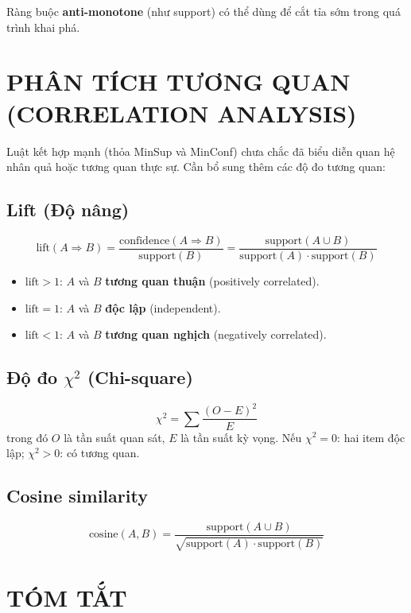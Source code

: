 \documentclass[10pt]{article}
\begin{document}
Ràng buộc \textbf{anti-monotone} (như support) có thể dùng để cắt tỉa sớm trong quá trình khai phá.

\section{PHÂN TÍCH TƯƠNG QUAN (CORRELATION ANALYSIS)}

Luật kết hợp mạnh (thỏa MinSup và MinConf) chưa chắc đã biểu diễn quan hệ nhân quả hoặc tương quan thực sự. Cần bổ sung thêm các độ đo tương quan:

\subsection{Lift (Độ nâng)}

\[
\text{lift}(A \Rightarrow B) = \frac{\text{confidence}(A \Rightarrow B)}{\text{support}(B)} = \frac{\text{support}(A \cup B)}{\text{support}(A) \cdot \text{support}(B)}
\]

\begin{itemize}
    \item $\text{lift} > 1$: $A$ và $B$ \textbf{tương quan thuận} (positively correlated).
    \item $\text{lift} = 1$: $A$ và $B$ \textbf{độc lập} (independent).
    \item $\text{lift} < 1$: $A$ và $B$ \textbf{tương quan nghịch} (negatively correlated).
\end{itemize}

\subsection{Độ đo $\chi^2$ (Chi-square)}

\[
\chi^2 = \sum \frac{(O - E)^2}{E}
\]
trong đó $O$ là tần suất quan sát, $E$ là tần suất kỳ vọng. Nếu $\chi^2 = 0$: hai item độc lập; $\chi^2 > 0$: có tương quan.

\subsection{Cosine similarity}

\[
\text{cosine}(A, B) = \frac{\text{support}(A \cup B)}{\sqrt{\text{support}(A) \cdot \text{support}(B)}}
\]

\section{TÓM TẮT}
\end{document}
